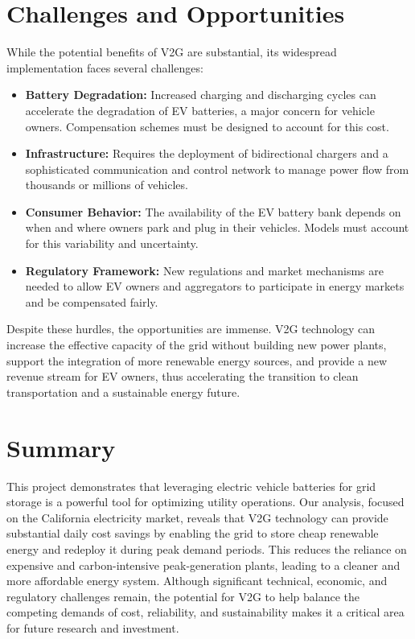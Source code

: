 \documentclass[12pt, letterpaper]{article}
\begin{document}
\section{Challenges and Opportunities}
While the potential benefits of V2G are substantial, its widespread implementation faces several challenges:
\begin{itemize}
    \item \textbf{Battery Degradation:} Increased charging and discharging cycles can accelerate the degradation of EV batteries, a major concern for vehicle owners. Compensation schemes must be designed to account for this cost.
    \item \textbf{Infrastructure:} Requires the deployment of bidirectional chargers and a sophisticated communication and control network to manage power flow from thousands or millions of vehicles.
    \item \textbf{Consumer Behavior:} The availability of the EV battery bank depends on when and where owners park and plug in their vehicles. Models must account for this variability and uncertainty.
    \item \textbf{Regulatory Framework:} New regulations and market mechanisms are needed to allow EV owners and aggregators to participate in energy markets and be compensated fairly.
\end{itemize}

Despite these hurdles, the opportunities are immense. V2G technology can increase the effective capacity of the grid without building new power plants, support the integration of more renewable energy sources, and provide a new revenue stream for EV owners, thus accelerating the transition to clean transportation and a sustainable energy future.

\section{Summary}
This project demonstrates that leveraging electric vehicle batteries for grid storage is a powerful tool for optimizing utility operations. Our analysis, focused on the California electricity market, reveals that V2G technology can provide substantial daily cost savings by enabling the grid to store cheap renewable energy and redeploy it during peak demand periods. This reduces the reliance on expensive and carbon-intensive peak-generation plants, leading to a cleaner and more affordable energy system. Although significant technical, economic, and regulatory challenges remain, the potential for V2G to help balance the competing demands of cost, reliability, and sustainability makes it a critical area for future research and investment.
\end{document}
